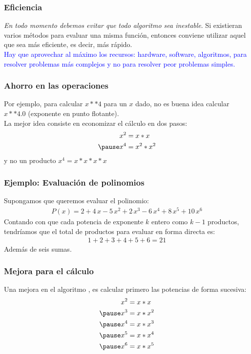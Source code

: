 \documentclass[12pt]{beamer}
\begin{document}
\begin{frame}
\frametitle{Eficiencia}
\emph{En todo momento debemos evitar que todo algoritmo sea inestable}. \pause Si existieran varios métodos para evaluar una misma función, entonces conviene utilizar aquel que sea más eficiente, es decir, más rápido.
\\
\bigskip
\pause
\textcolor{blue}{Hay que aprovechar al máximo los recursos: hardware, software, algoritmos, para resolver problemas más complejos y no para resolver peor problemas simples.}
\end{frame}
\begin{frame}
\frametitle{Ahorro en las operaciones}
Por ejemplo, para calcular $x**4$ para un $x$ dado, no es buena idea calcular $x**4.0$ (exponente en punto flotante).
\\
\bigskip
\pause
La mejor idea consiste en economizar el cálculo en dos pasos:
\pause
\begin{eqnarray*}
\begin{aligned}
x^{2} &= x * x \\ \pause
x^{4} &= x^{2} * x^{2}
\end{aligned}
\end{eqnarray*}
y no un producto $x^{4} = x * x * x * x$
\end{frame}
\begin{frame}
\frametitle{Ejemplo: Evaluación de polinomios}
Supongamos que queremos evaluar el polinomio:
\pause
\begin{align*}
P (x) = 2 + 4 \, x - 5 \, x^{2} + 2 \, x^{3} - 6 \, x^{4} + 8 \, x^{5} + 10 \, x^{6}
\end{align*}
\pause
Contando con que cada potencia de exponente $k$ entero como $k-1$ productos, tendríamos que el total de productos para evaluar en forma directa es:
\pause
\begin{align*}
1 + 2 + 3 + 4 + 5 + 6 = 21
\end{align*}
Además de seis sumas.
\end{frame}
\begin{frame}
\frametitle{Mejora para el cálculo}
Una mejora en el algoritmo , es calcular primero las potencias de forma sucesiva:
\pause
\begin{eqnarray*}
\begin{aligned}
x^{2} &= x * x \\ \pause
x^{3} &= x * x^{2} \\ \pause
x^{4} &= x * x^{3} \\ \pause
x^{5} &= x * x^{4} \\ \pause
x^{6} &= x * x^{5}
\end{aligned}
\end{eqnarray*}
\end{frame}
\end{document}

